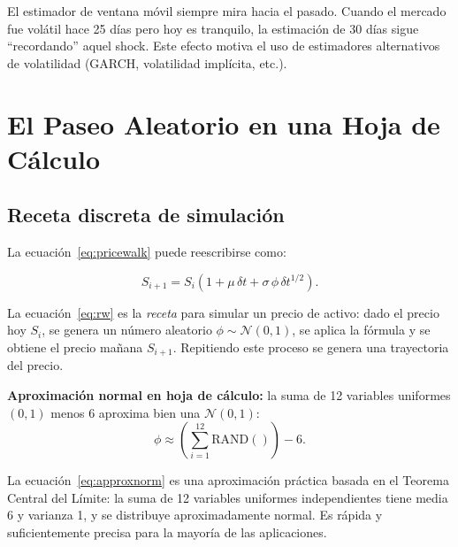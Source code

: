 \documentclass[12pt]{article}
\begin{document}
\begin{intuicion}
El estimador de ventana m\'ovil siempre mira hacia el pasado. Cuando el mercado
fue vol\'atil hace 25 d\'ias pero hoy es tranquilo, la estimaci\'on de 30 d\'ias
sigue ``recordando'' aquel shock. Este efecto motiva el uso de estimadores
alternativos de volatilidad (GARCH, volatilidad impl\'icita, etc.).
\end{intuicion}

\section{El Paseo Aleatorio en una Hoja de C\'alculo}

\subsection{Receta discreta de simulaci\'on}

La ecuaci\'on~\eqref{eq:pricewalk} puede reescribirse como:

\begin{equation}
  S_{i+1} = S_i\!\left(1 + \mu\,\delta t + \sigma\,\phi\,\delta t^{1/2}\right).
  \label{eq:rw}
\end{equation}

\begin{intuicionmat}
La ecuaci\'on~\eqref{eq:rw} es la \emph{receta} para simular un precio de activo:
dado el precio hoy $S_i$, se genera un n\'umero aleatorio $\phi \sim \mathcal{N}(0,1)$,
se aplica la f\'ormula y se obtiene el precio ma\~nana $S_{i+1}$.
Repitiendo este proceso se genera una trayectoria del precio.
\end{intuicionmat}

\textbf{Aproximaci\'on normal en hoja de c\'alculo:}
la suma de 12 variables uniformes $(0,1)$ menos 6 aproxima bien una $\mathcal{N}(0,1)$:
\begin{equation}
  \phi \approx \left(\sum_{i=1}^{12}\mathrm{RAND}()\right) - 6.
  \label{eq:approxnorm}
\end{equation}

\begin{intuicionmat}
La ecuaci\'on~\eqref{eq:approxnorm} es una aproximaci\'on pr\'actica basada en el
Teorema Central del L\'imite: la suma de 12 variables uniformes independientes tiene
media 6 y varianza 1, y se distribuye aproximadamente normal.
Es r\'apida y suficientemente precisa para la mayor\'ia de las aplicaciones.
\end{intuicionmat}
\end{document}
